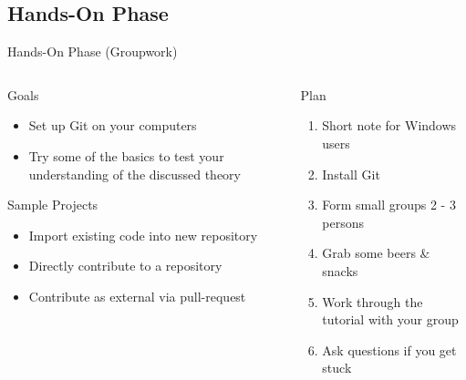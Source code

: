 \documentclass[xetex]{beamer}
\begin{document}
\subsection{Hands-On Phase}

\begin{frame}{Hands-On Phase (Groupwork)}
  \begin{columns}
    \begin{column}{.5\linewidth}
      \begin{alertblock}{Goals}
        \begin{itemize}
          \item Set up Git on your computers
          \item Try some of the basics to test your understanding of the
            discussed theory
        \end{itemize}
      \end{alertblock}
      \begin{exampleblock}{Sample Projects}
        \begin{itemize}
          \item Import existing code into new repository
          \item Directly contribute to a repository
          \item Contribute as external via pull-request
        \end{itemize}
      \end{exampleblock}
    \end{column}
    \begin{column}{.5\linewidth}
      \begin{block}{Plan}
        \begin{enumerate}
          \item Short note for Windows users
          \item Install Git
          \item Form small groups 2 - 3 persons
          \item Grab some beers \& snacks
          \item Work through the tutorial with your group
          \item Ask questions if you get stuck
        \end{enumerate}
      \end{block}
    \end{column}
  \end{columns}
\end{frame}
\end{document}
